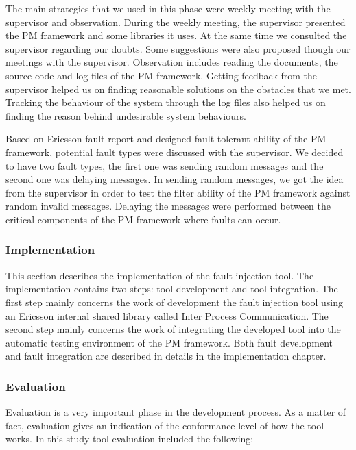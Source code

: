 The main strategies that we used in this phase were weekly meeting with the supervisor and observation. During the weekly meeting, the supervisor presented the PM framework and some libraries it uses. At the same time we consulted the supervisor regarding our doubts. Some suggestions were also proposed though our meetings with the supervisor. Observation includes reading the documents, the source code and log files of the PM framework. Getting feedback from the supervisor helped us on finding reasonable solutions on the obstacles that we met. Tracking the behaviour of the system through the log files also helped us on finding the reason behind undesirable system behaviours. 

Based on Ericsson fault report and designed fault tolerant ability of the PM framework, potential fault types were discussed with the supervisor. We decided to have two fault types, the first one was sending random messages and the second one was delaying messages. In sending random messages, we got the idea from the supervisor in order to test the filter ability of the PM framework against random invalid messages. Delaying the messages were performed between the critical components of the PM framework where faults can occur.         


\subsubsection{Implementation}
This section describes the implementation of the fault injection tool. The implementation contains two steps: tool development and tool integration. The first step mainly concerns the work of development the fault injection tool using an Ericsson internal shared library called Inter Process Communication. The second step mainly concerns the work of integrating the developed tool into the automatic testing environment of the PM framework. Both fault development and fault integration are described in details in the implementation chapter. 
  
\subsubsection{Evaluation}
Evaluation is a very important phase in the development process. As a matter of fact, evaluation gives an indication of the conformance level of how the tool works. In this study tool evaluation included the following:   

